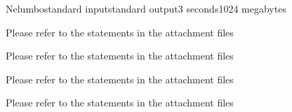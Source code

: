 \begin{problem}{Nelumbo}{standard input}{standard output}{3 seconds}{1024 megabytes}

Please refer to the statements in the attachment files

\InputFile
Please refer to the statements in the attachment files

\OutputFile
Please refer to the statements in the attachment files

\Example

\begin{example}
%
\end{example}

\Note
Please refer to the statements in the attachment files

\end{problem}

